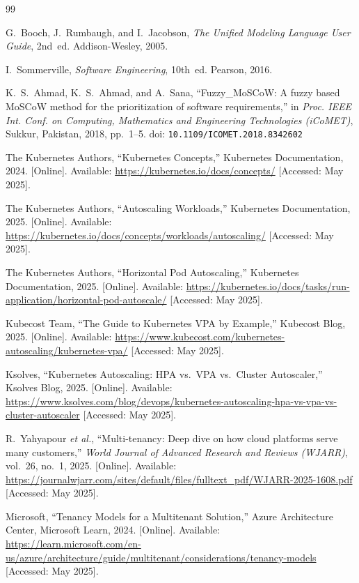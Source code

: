\begin{thebibliography}{99}

G.~Booch, J.~Rumbaugh, and I.~Jacobson,
\textit{The Unified Modeling Language User Guide}, 2nd~ed.
Addison-Wesley, 2005.

I.~Sommerville,
\textit{Software Engineering}, 10th~ed.
Pearson, 2016.

K.~S.~Ahmad, K.~S.~Ahmad, and A.~Sana,
``Fuzzy\_MoSCoW: A fuzzy based MoSCoW method for the prioritization of software requirements,''
in \textit{Proc. IEEE Int. Conf. on Computing, Mathematics and Engineering Technologies (iCoMET)},
Sukkur, Pakistan, 2018, pp.~1--5.
doi: \texttt{10.1109/ICOMET.2018.8342602}

The Kubernetes Authors,
``Kubernetes Concepts,''
Kubernetes Documentation, 2024.
[Online]. Available: \url{https://kubernetes.io/docs/concepts/}
[Accessed: May 2025].

The Kubernetes Authors,
``Autoscaling Workloads,''
Kubernetes Documentation, 2025.
[Online]. Available: \url{https://kubernetes.io/docs/concepts/workloads/autoscaling/}
[Accessed: May 2025].

The Kubernetes Authors,
``Horizontal Pod Autoscaling,''
Kubernetes Documentation, 2025.
[Online]. Available: \url{https://kubernetes.io/docs/tasks/run-application/horizontal-pod-autoscale/}
[Accessed: May 2025].

Kubecost Team,
``The Guide to Kubernetes VPA by Example,''
Kubecost Blog, 2025.
[Online]. Available: \url{https://www.kubecost.com/kubernetes-autoscaling/kubernetes-vpa/}
[Accessed: May 2025].

Ksolves,
``Kubernetes Autoscaling: HPA vs.\ VPA vs.\ Cluster Autoscaler,''
Ksolves Blog, 2025.
[Online]. Available: \url{https://www.ksolves.com/blog/devops/kubernetes-autoscaling-hpa-vs-vpa-vs-cluster-autoscaler}
[Accessed: May 2025].

R.~Yahyapour \textit{et al.},
``Multi-tenancy: Deep dive on how cloud platforms serve many customers,''
\textit{World Journal of Advanced Research and Reviews (WJARR)},
vol.~26, no.~1, 2025.
[Online]. Available: \url{https://journalwjarr.com/sites/default/files/fulltext_pdf/WJARR-2025-1608.pdf}
[Accessed: May 2025].

Microsoft,
``Tenancy Models for a Multitenant Solution,''
Azure Architecture Center, Microsoft Learn, 2024.
[Online]. Available: \url{https://learn.microsoft.com/en-us/azure/architecture/guide/multitenant/considerations/tenancy-models}
[Accessed: May 2025].

\end{thebibliography}
